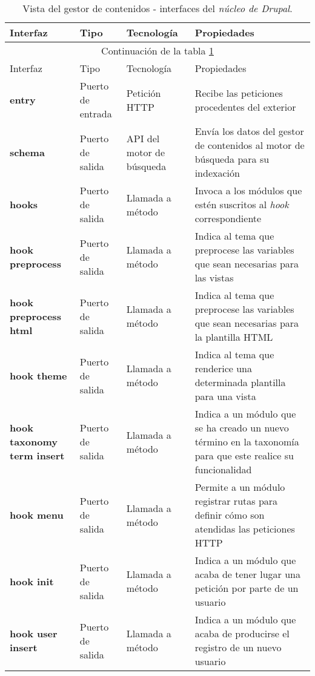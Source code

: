 \begin{longtable}[c]{|p{25mm}|p{20mm}|p{30mm}|p{60mm}|}
	\caption{Vista del gestor de contenidos - interfaces del \textit{núcleo de Drupal}.\label{interfaces_cms_drupalcore}}\\
		\hline
			Interfaz & Tipo & Tecnología & Propiedades\\
		\hline
		\hline
	\endfirsthead
		\hline
		\multicolumn{4}{|c|}{Continuación de la tabla \ref{interfaces_cms_drupalcore}}\\
		\hline
			Interfaz & Tipo & Tecnología & Propiedades\\
		\hline
		\hline
	\endhead
	\hline
	\endfoot
		\textbf{entry} & Puerto de entrada & Petición HTTP & Recibe las peticiones procedentes del exterior \\
		\hline
		
		\textbf{schema} & Puerto de salida & API del motor de búsqueda & Envía los datos del gestor de contenidos al motor de búsqueda para su indexación \\
		\hline
		
		\textbf{hooks} & Puerto de salida & Llamada a método & Invoca a los módulos que estén suscritos al \textit{hook} correspondiente \\
		\hline
		
		\textbf{hook preprocess} & Puerto de salida & Llamada a método & Indica al tema que preprocese las variables que sean necesarias para las vistas \\
		\hline
		
		\textbf{hook preprocess html} & Puerto de salida & Llamada a método & Indica al tema que preprocese las variables que sean necesarias para la plantilla HTML \\
		\hline
		
		\textbf{hook theme} & Puerto de salida & Llamada a método & Indica al tema que renderice una determinada plantilla para una vista \\
		\hline
		
		\textbf{hook taxonomy term insert} & Puerto de salida & Llamada a método & Indica a un módulo que se ha creado un nuevo término en la taxonomía para que este realice su funcionalidad \\
		\hline
		
		\textbf{hook menu} & Puerto de salida & Llamada a método & Permite a un módulo registrar rutas para definir cómo son atendidas las peticiones HTTP \\
		\hline
		
		\textbf{hook init} & Puerto de salida & Llamada a método & Indica a un módulo que acaba de tener lugar una petición por parte de un usuario \\
		\hline
		
		\textbf{hook user insert} & Puerto de salida & Llamada a método & Indica a un módulo que acaba de producirse el registro de un nuevo usuario \\
	\hline
	\hline
\end{longtable}


